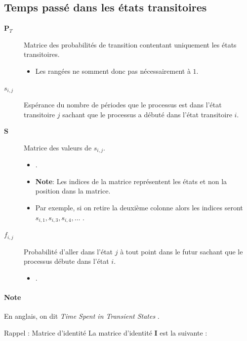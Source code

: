 \documentclass[french]{article}
\begin{document}
\begin{multicols*}{2}
\subsection{Temps passé dans les états transitoires}
\begin{distributions}[Notation]
\begin{description}
	\item[$\bm{P}_{T}$]Matrice des probabilités de transition contentant uniquement les états transitoires.
		\begin{itemize}
		\item	Les rangées ne somment donc pas nécessairement à $1$.
		\end{itemize}
	\item[$s_{i, j}$]	Espérance du nombre de périodes que le processus est dans l'état transitoire $j$ sachant que le processus a débuté dans l'état transitoire $i$.
	\item[$\bm{S}$]	Matrice des valeurs de $s_{i, j}$.
		\begin{itemize}
		\item	{}.
		\item	\textbf{Note}: Les indices de la matrice représentent les états et non la position dans la matrice. 
		\item	Par exemple, si on retire la deuxième colonne alors les indices seront $s_{i, 1}, s_{i, 3}, s_{i, 4}, \dots$	.
		\end{itemize}
	\item[$f_{i, j}$]	Probabilité d'aller dans l'état $j$ à tout point dans le futur sachant que le processus débute dans l'état $i$.
		\begin{itemize}
		\item	{}.
		\end{itemize}
\end{description}
\end{distributions}

\paragraph{Note}	En anglais, on dit \og \textit{Time Spent in Transient States} \fg{}.

\bigskip

\begin{rappel}{Rappel : Matrice d'identité}
La matrice d'identité $\bm{I}$ est la suivante : 


\end{rappel}
\end{multicols*}
\end{document}
